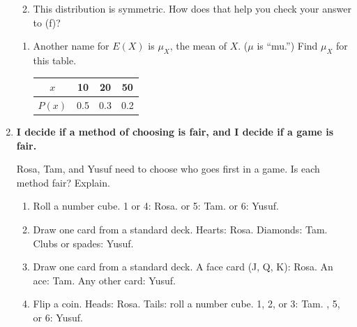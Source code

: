 \documentclass[11pt]{article}
\newcommand{\goal}[1]{\textbf{#1}\par\vspace{0.35em}}
\begin{document}
\begin{enumerate}[resume]
\begin{enumerate}[start=6,itemsep=1em]
  \work{3em}
  \item This distribution is symmetric. How does that help you check your answer to (f)?

  \work{2.5em}
\end{enumerate}

\vspace{0.4em}
\begin{enumerate}[start=8,itemsep=1em]
  \item Another name for $E(X)$ is $\mu_X$, the mean of $X$. ($\mu$ is ``mu.'') Find $\mu_X$ for this table.

  \vspace{0.3em}
  \renewcommand{\arraystretch}{1.4}
  \begin{tabular}{|c|c|c|c|}\hline $x$ & 10 & 20 & 50\\ \hline $P(x)$ & 0.5 & 0.3 & 0.2\\ \hline\end{tabular}
  \qquad {}
\end{enumerate}

\newpage
\item \goal{I decide if a method of choosing is fair, and I decide if a game is fair.}
Rosa, Tam, and Yusuf need to choose who goes first in a game. Is each method fair? Explain.
\begin{enumerate}[itemsep=1em]
  \item Roll a number cube. 1 or 4: Rosa.  or 5: Tam.  or 6: Yusuf.

  \work{3em}
  \item Draw one card from a standard deck. Hearts: Rosa. \; Diamonds: Tam. \; Clubs or spades: Yusuf.

  \work{3em}
  \item Draw one card from a standard deck. A face card (J, Q, K): Rosa. \; An ace: Tam. \; Any other card: Yusuf.

  \work{3em}
  \item Flip a coin. Heads: Rosa. Tails: roll a number cube. 1, 2, or 3: Tam. , 5, or 6: Yusuf.


\end{enumerate}
\end{enumerate}
\end{document}
